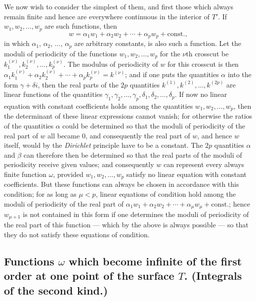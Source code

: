 \documentclass{article}
\begin{document}
We now wish to consider the simplest of them, and first those which always remain finite and hence are everywhere continuous in the interior of $T'$. If $w_{1}, w_{2}, \ldots, w_{p}$ are such functions, then
\[ w = \alpha_{1} w_{1} + \alpha_{2} w_{2} + \cdots + \alpha_{p} w_{p} + \text{const.}, \]
in which $\alpha_{1}$, $\alpha_{2}$, $\ldots$, $\alpha_{p}$ are arbitrary constants, is also such a function. Let the moduli of periodicity of the functions $w_{1}, w_{2}, \ldots, w_{p}$ for the $\nu$th crosscut be $k_{1}^{(\nu)}, k_{2}^{(\nu)}, \ldots, k_{p}^{(\nu)}$. The modulus of periodicity of $w$ for this crosscut is then $\alpha_{1} k_{1}^{(\nu)} + \alpha_{2} k_{2}^{(\nu)} + \cdots + \alpha_{p} k_{p}^{(\nu)} = k^{(\nu)}$; and if one puts the quantities $\alpha$ into the form $\gamma + \delta i$, then the real parts of the $2p$ quantities $k^{(1)}, k^{(2)}, \ldots, k^{(2p)}$ are linear functions of the quantities $\gamma_{1}, \gamma_{2}, \ldots, \gamma_{p}, \delta_{1}, \delta_{2}, \ldots, \delta_{p}$. If now no linear equation with constant coefficients holds among the quantities $w_{1}, w_{2}, \ldots, w_{p}$, then the determinant of these linear expressions cannot vanish; for otherwise the ratios of the quantities $\alpha$ could be determined so that the moduli of periodicity of the real part of $w$ all became 0, and consequently the real part of $w$, and hence $w$ itself, would by the \emph{Dirichlet} principle have to be a constant. The $2p$ quantities $\alpha$ and $\beta$ can therefore then be determined so that the real parts of the moduli of periodicity receive given values; and consequently $w$ can represent every always finite function $\omega$, provided $w_{1}, w_{2}, \ldots, w_{p}$ satisfy no linear equation with constant coefficients. But these functions can always be chosen in accordance with this condition; for as long as $\mu < p$, linear equations of condition hold among the moduli of periodicity of the real part of $\alpha_{1} w_{1} + \alpha_{2} w_{2} + \cdots + \alpha_{\mu} w_{\mu} + \text{const.}$; hence $w_{\mu+1}$ is not contained in this form if one determines the moduli of periodicity of the real part of this function --- which by the above is always possible --- so that they do not satisfy these equations of condition.

\subsection*{Functions $\omega$ which become infinite of the first order at one point of the surface $T$. (Integrals of the second kind.)}
\end{document}
